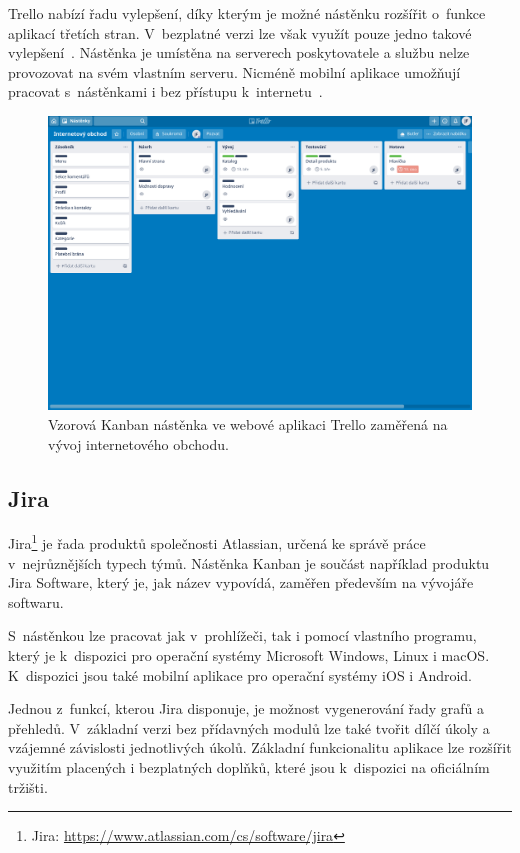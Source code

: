 Trello nabízí řadu vylepšení, díky kterým je možné nástěnku rozšířit o~funkce aplikací třetích stran. 
V~bezplatné verzi lze však využít pouze jedno takové vylepšení~\cite{bib:trello-pricing}.
Nástěnka je umístěna na serverech poskytovatele a službu nelze provozovat na svém vlastním serveru. Nicméně mobilní aplikace umožňují pracovat s~nástěnkami i bez přístupu k~internetu~\cite{bib:trello-common}.

\begin{figure}[H]
	\centering
	\includegraphics[width=\textwidth]{obrazky-figures/trello.png}
	\caption{Vzorová Kanban nástěnka ve webové aplikaci Trello zaměřená na vývoj internetového obchodu.}
\end{figure}

\subsection{Jira}
Jira\footnote{Jira: \url{https://www.atlassian.com/cs/software/jira}} je řada produktů společnosti Atlassian, určená ke správě práce v~nejrůznějších typech týmů. Nástěnka Kanban je součást například produktu Jira Software, který je, jak název vypovídá, zaměřen především na vývojáře softwaru. 

S~nástěnkou lze pracovat jak v~prohlížeči, tak i pomocí vlastního programu, který je k~dispozici pro operační systémy Microsoft Windows, Linux i macOS. K~dispozici jsou také mobilní aplikace pro operační systémy iOS i Android. 

Jednou z~funkcí, kterou Jira disponuje, je možnost vygenerování řady grafů a přehledů. V~základní verzi bez přídavných modulů lze také tvořit dílčí úkoly a vzájemné závislosti jednotlivých úkolů. Základní funkcionalitu aplikace lze rozšířit využitím placených i bezplatných doplňků, které jsou k~dispozici na oficiálním tržišti.

